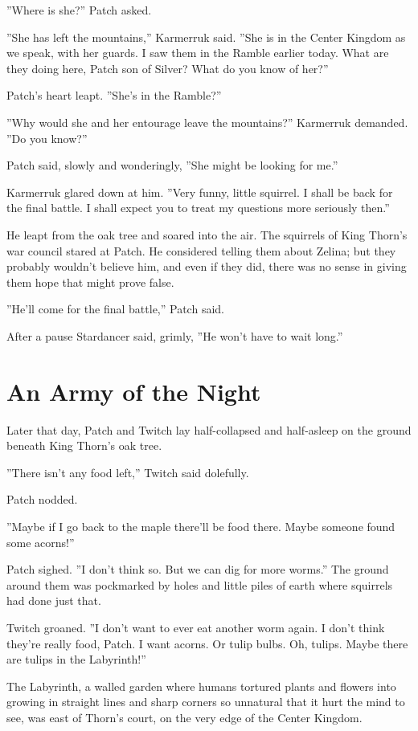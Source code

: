 \documentclass[12pt]{book}
\begin{document}
''Where is she?'' Patch asked.

''She has left the mountains,'' Karmerruk said. ''She is in the Center Kingdom as we speak, with her guards. I saw them in the Ramble earlier today. What are they doing here, Patch son of Silver? What do you know of her?''

Patch's heart leapt. ''She's in the Ramble?''

''Why would she and her entourage leave the mountains?'' Karmerruk demanded. ''Do you know?''

Patch said, slowly and wonderingly, ''She might be looking for me.''

Karmerruk glared down at him. ''Very funny, little squirrel. I shall be back for the final battle. I shall expect you to treat my questions more seriously then.''

He leapt from the oak tree and soared into the air. The squirrels of King Thorn's war council stared at Patch. He considered telling them about Zelina; but they probably wouldn't believe him, and even if they did, there was no sense in giving them hope that might prove false.

''He'll come for the final battle,'' Patch said.

After a pause Stardancer said, grimly, ''He won't have to wait long.''


\section{An Army of the Night}

Later that day, Patch and Twitch lay half-collapsed and half-asleep on the ground beneath King Thorn's oak tree.

''There isn't any food left,'' Twitch said dolefully.

Patch nodded.

''Maybe if I go back to the maple there'll be food there. Maybe someone found some acorns!''

Patch sighed. ''I don't think so. But we can dig for more worms.'' The ground around them was pockmarked by holes and little piles of earth where squirrels had done just that.

Twitch groaned. ''I don't want to ever eat another worm again. I don't think they're really food, Patch. I want acorns. Or tulip bulbs. Oh, tulips. Maybe there are tulips in the Labyrinth!''

The Labyrinth, a walled garden where humans tortured plants and flowers into growing in straight lines and sharp corners so unnatural that it hurt the mind to see, was east of Thorn's court, on the very edge of the Center Kingdom.
\end{document}
